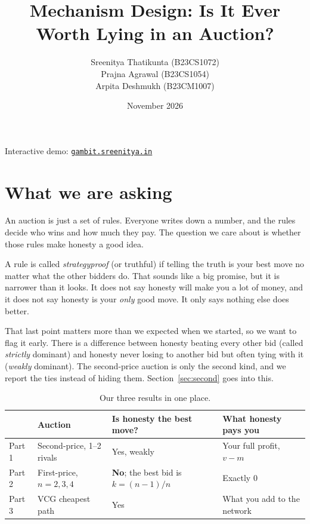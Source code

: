 \documentclass[10pt,a4paper]{article}
\title{\textbf{Mechanism Design: Is It Ever Worth Lying in an Auction?}}
\author{
Sreenitya Thatikunta (B23CS1072) \\
Prajna Agrawal (B23CS1054) \\
Arpita Deshmukh (B23CM1007)
}
\date{November 2026}
\begin{document}
\maketitle

\begin{center}
Interactive demo: \href{https://gambit.sreenitya.in}{\texttt{gambit.sreenitya.in}}
\end{center}

\section{What we are asking}

An auction is just a set of rules. Everyone writes down a number, and the rules decide who
wins and how much they pay. The question we care about is whether those rules make honesty
a good idea.

A rule is called \emph{strategyproof} (or truthful) if telling the truth is your best move
no matter what the other bidders do. That sounds like a big promise, but it is narrower
than it looks. It does not say honesty will make you a lot of money, and it does not say
honesty is your \emph{only} good move. It only says nothing else does better.

That last point matters more than we expected when we started, so we want to flag it
early. There is a difference between honesty beating every other bid (called
\emph{strictly} dominant) and honesty never losing to another bid but often tying with it
(\emph{weakly} dominant). The second-price auction is only the second kind, and we report
the ties instead of hiding them. Section~\ref{sec:second} goes into this.

\begin{table}[h]
\centering
\small
\begin{tabular}{llll}
\toprule
& \textbf{Auction} & \textbf{Is honesty the best move?} & \textbf{What honesty pays you} \\
\midrule
Part 1 & Second-price, 1--2 rivals & Yes, weakly & Your full profit, $v - m$ \\
Part 2 & First-price, $n = 2, 3, 4$ & \textbf{No}; the best bid is $k = (n-1)/n$ & Exactly $0$ \\
Part 3 & VCG cheapest path & Yes & What you add to the network \\
\bottomrule
\end{tabular}
\caption{Our three results in one place.}
\end{table}
\end{document}
